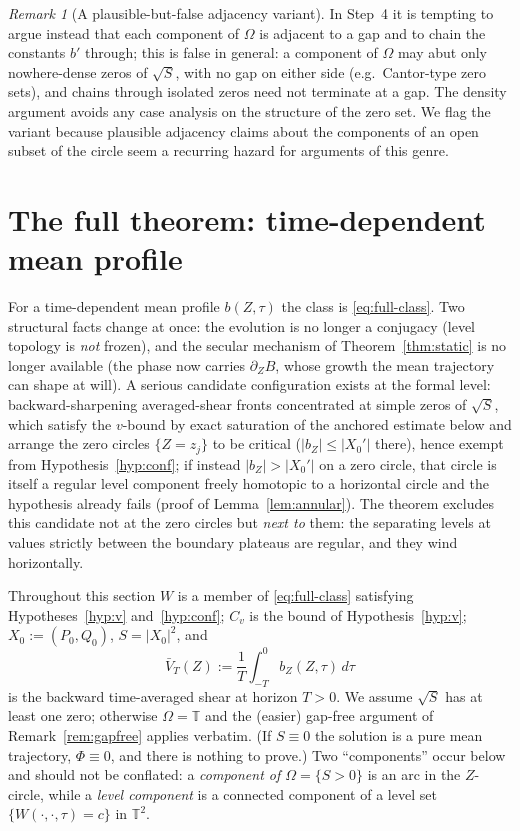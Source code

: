 \documentclass[11pt]{amsart}
\theoremstyle{definition}
\theoremstyle{remark}
\newtheorem{remark}[theorem]{Remark}
\newcommand{\T}{\mathbb{T}}
\begin{document}
\begin{remark}[A plausible-but-false adjacency variant]
\label{rem:adjacency}
In Step~4 it is tempting to argue instead that each component of
$\Omega$ is adjacent to a gap and to chain the constants $b'$ through;
this is false in general: a component of $\Omega$ may abut only
nowhere-dense zeros of $\sqrt S$, with no gap on either side (e.g.\
Cantor-type zero sets), and chains through isolated zeros need not
terminate at a gap. The density argument avoids any case analysis on
the structure of the zero set. We flag the variant because plausible
adjacency claims about the components of an open subset of the circle
seem a recurring hazard for arguments of this genre.
\end{remark}

\section{The full theorem: time-dependent mean profile}\label{sec:full}

For a time-dependent mean profile $b(Z,\tau)$ the class is
\eqref{eq:full-class}. Two structural facts change at once: the
evolution is no longer a conjugacy (level topology is \emph{not}
frozen), and the secular mechanism of Theorem~\ref{thm:static} is no
longer available (the phase now carries $\partial_ZB$, whose growth the
mean trajectory can shape at will). A serious candidate configuration
exists at the formal level: backward-sharpening averaged-shear fronts
concentrated at simple zeros of $\sqrt S$, which satisfy the $v$-bound
by exact saturation of the anchored estimate below and arrange the zero
circles $\{Z=z_j\}$ to be critical ($|b_Z|\le|X_0'|$ there), hence
exempt from Hypothesis~\ref{hyp:conf}; if instead $|b_Z|>|X_0'|$ on a
zero circle, that circle is itself a regular level component freely
homotopic to a horizontal circle and the hypothesis already fails (proof
of Lemma~\ref{lem:annular}). The theorem excludes this candidate not at
the zero circles but \emph{next to} them: the separating levels at
values strictly between the boundary plateaus are regular, and they
wind horizontally.

Throughout this section $W$ is a member of \eqref{eq:full-class}
satisfying Hypotheses~\ref{hyp:v} and~\ref{hyp:conf}; $C_v$ is the
bound of Hypothesis~\ref{hyp:v}; $X_0:=(P_0,Q_0)$, $S=|X_0|^2$, and
\[
  \bar V_T(Z):=\frac1T\int_{-T}^0 b_Z(Z,\tau)\,d\tau
\]
is the backward time-averaged shear at horizon $T>0$. We assume
$\sqrt S$ has at least one zero; otherwise $\Omega=\T$ and the (easier)
gap-free argument of Remark~\ref{rem:gapfree} applies verbatim. (If
$S\equiv0$ the solution is a pure mean trajectory, $\Phi\equiv0$, and
there is nothing to prove.) Two ``components'' occur below and should not
be conflated: a \emph{component of $\Omega=\{S>0\}$} is an arc in the
$Z$-circle, while a \emph{level component} is a connected component of a
level set $\{W(\cdot,\cdot,\tau)=c\}$ in $\T^2$.
\end{document}
